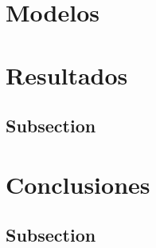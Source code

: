 \documentclass[11pt,a4paper,twoside]{thesis}
\begin{document}
\chapter{Modelos}

\chapter{Resultados}


\section{Subsection}

\chapter{Conclusiones}

\section{Subsection}




\renewcommand{\bibname}{Referencias}
\end{document}
